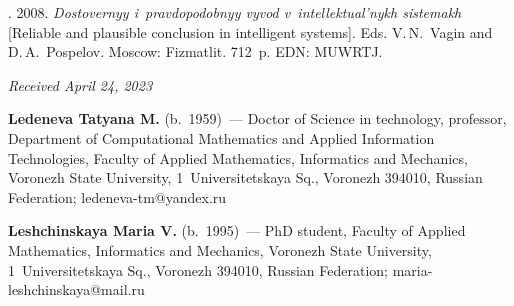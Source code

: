 \begin{multicols}{2}
{{\begin{thebibliography}{99}
. 
2008. \textit{Dostovernyy i~pravdopodobnyy vyvod v~intellektual'nykh sistemakh} 
[Reliable and plausible conclusion in intelligent systems]. Eds. V.\,N.~Vagin and 
D.\,A.~Pospelov. Moscow: Fizmatlit. 712~p. EDN: MUWRTJ.

\end{thebibliography}

 }
 }

\end{multicols}

\vspace*{-6pt}

\hfill{\small\textit{Received April 24, 2023}} 

\vspace*{-18pt}
     
     \Contr
     
     \vspace*{-3pt}

\noindent
\textbf{Ledeneva Tatyana M.} (b.\ 1959)~--- Doctor of Science in technology, 
professor, Department of Computational Mathematics and Applied Information 
Technologies, Faculty of Applied Mathematics, Informatics and Mechanics, Voronezh 
State University, 1~Universitetskaya Sq., Voronezh 394010, Russian Federation; 
\mbox{ledeneva-tm@yandex.ru}

\vspace*{3pt}

\noindent
\textbf{Leshchinskaya Maria V.} (b.\ 1995)~--- PhD student, Faculty of Applied 
Mathematics, Informatics and Mechanics, Voronezh State University, 
1~Universitetskaya Sq., Voronezh 394010, Russian Federation; maria-
\mbox{leshchinskaya@mail.ru}



\label{end\stat}

\renewcommand{\bibname}{\protect\rm Литература} 